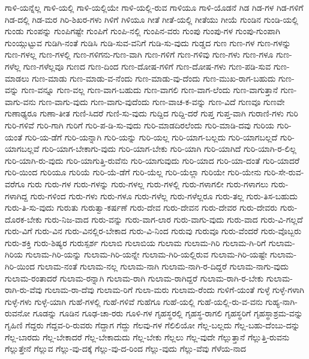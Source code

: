 {ಗಾಳಿ-ಯನ್ನೆಲ್ಲ
ಗಾಳಿ-ಯಲ್ಲಿ
ಗಾಳಿ-ಯಲ್ಲಿಯೇ
ಗಾಳಿ-ಯಲ್ಲಿ-ರುವ
ಗಾಳಿಯೂ
ಗಾಳಿ-ಯೊಡನೆ
ಗಿಡ
ಗಿಡ-ಗಳ
ಗಿಡ-ಗಳಿಗೆ
ಗಿಡ-ದಲ್ಲಿ
ಗಿಡ-ಮರ
ಗಿರಿ-ಶಿಖರ-ಗಳು
ಗಿಳಿಗೆ
ಗಿಳಿಯೂ
ಗೀತೆ
ಗೀತೆ-ಯಲ್ಲಿ
ಗೀತೆಯು
ಗೀಯೆ
ಗುಂಡಿನ
ಗುಂಡಿ-ಯಲ್ಲಿ
ಗುಂಡು
ಗುಂಪನ್ನು
ಗುಂಪಿಗಷ್ಟೇ
ಗುಂಪಿಗೆ
ಗುಂಪಿ-ನಲ್ಲಿ
ಗುಂಪಿನ-ವರು
ಗುಂಪು
ಗುಂಪು-ಗಳ
ಗುಂಪು-ಗುಂಪಾಗಿ
ಗುಂಯ್ಗುಟ್ಟುವ
ಗುಡಿಗಿ-ನಂತೆ
ಗುಡಿಸಿ
ಗುಡಿ-ಸುವ-ವನಿಗೆ
ಗುಡಿ-ಸು-ವುದು
ಗುಡ್ಡದ
ಗುಣ
ಗುಣ-ಗಳ
ಗುಣ-ಗಳನ್ನು
ಗುಣ-ಗಳಲ್ಲ
ಗುಣ-ಗಳಲ್ಲಿ
ಗುಣ-ಗಳಿಗನು-ಗುಣ-ವಾಗಿ
ಗುಣ-ಗಳಿಗೆ
ಗುಣ-ಗಳಿವು
ಗುಣ-ಗಳು
ಗುಣ-ಗಳೂ
ಗುಣ-ಗಳೆಲ್ಲ
ಗುಣ-ಗಳೆಲ್ಲವೂ
ಗುಣದ
ಗುಣ-ದಿಂದ
ಗುಣ-ದೋಷ-ಗಳಿಗೆ
ಗುಣ-ದೋಷ-ಗಳು
ಗುಣ-ಪಡಿ-ಸುವ
ಗುಣ-ಮಾಡಲು
ಗುಣ-ಮಾಡು
ಗುಣ-ಮಾಡು-ವ-ನೆಂದು
ಗುಣ-ಮಾಡು-ವು-ದೆಂದು
ಗುಣ-ಮುಖ-ರಾಗ-ಬಹುದು
ಗುಣ-ವನ್ನು
ಗುಣ-ವನ್ನೂ
ಗುಣ-ವಲ್ಲ
ಗುಣ-ವಾಗ-ಬಹುದು
ಗುಣ-ವಾಗಲಿ
ಗುಣ-ವಾಗ-ಲೆಂದು
ಗುಣ-ವಾಗುತ್ತಾನೆ
ಗುಣ-ವಾಗು-ವನು
ಗುಣ-ವಾಗು-ವುದು
ಗುಣ-ವಾಗು-ವುದೆಂದು
ಗುಣ-ವಾಚ-ಕ-ವನ್ನು
ಗುಣ-ವಿದೆ
ಗುಣವೂ
ಗುಣವೇ
ಗುಣಾಢ್ಯರೂ
ಗುಣಾ-ತೀತ
ಗುಣಿ-ಸಿದರೆ
ಗುಣಿ-ಸು-ವುದು
ಗುದ್ದಿದ
ಗುದ್ದಿ-ದರೆ
ಗುಪ್ತ
ಗುಪ್ತ-ವಾಗಿ
ಗುರಾಣಿ-ಗಳು
ಗುರಿ
ಗುರಿ-ಗಳಿವೆ
ಗುರಿ-ಗಾಗಿ
ಗುರಿಗೆ
ಗುರಿ-ಪ-ಡಿ-ಸು-ವುದು
ಗುರಿ-ಮಾಡದಿರಲೆಂದು
ಗುರಿ-ಮಾಡಿ-ದವು
ಗುರಿಯ
ಗುರಿ-ಯಂತೆ
ಗುರಿ-ಯ-ಡೆಗೆ
ಗುರಿ-ಯನ್ನಾಗಿ
ಗುರಿ-ಯನ್ನು
ಗುರಿ-ಯಲ್ಲ
ಗುರಿ-ಯಾಗ-ಬಲ್ಲದು
ಗುರಿ-ಯಾಗಬಲ್ಲದೆ
ಗುರಿ-ಯಾಗಬಲ್ಲವೆ
ಗುರಿ-ಯಾಗ-ಬೇಕಾಗು-ವುದು
ಗುರಿ-ಯಾಗ-ಬೇಕು
ಗುರಿ-ಯಾಗಿ
ಗುರಿ-ಯಾಗಿದೆ
ಗುರಿ-ಯಾಗಿ-ರ-ಲಿಲ್ಲ
ಗುರಿ-ಯಾಗಿ-ರು-ವುದು
ಗುರಿ-ಯಾಗುತ್ತಿ-ರುವೆನು
ಗುರಿ-ಯಾಗುವುದು
ಗುರಿ-ಯಾದ
ಗುರಿ-ಯಾ-ದಂತೆ
ಗುರಿ-ಯಾದರೆ
ಗುರಿ-ಯಿಂದ
ಗುರಿಯೂ
ಗುರಿಯೆ
ಗುರಿ-ಯೆ-ಡೆಗೆ
ಗುರಿ-ಯೆಲ್ಲ
ಗುರಿ-ಯೆಲ್ಲಾ
ಗುರಿಯೇ
ಗುರಿ-ಯೇನು
ಗುರಿ-ಸೇ-ರುವ-ವರೆಗೂ
ಗುರು
ಗುರು-ಗಳ
ಗುರು-ಗಳನ್ನು
ಗುರು-ಗಳಲ್ಲ
ಗುರು-ಗಳಲ್ಲಿ
ಗುರು-ಗಳಾಗಲೀ
ಗುರು-ಗಳಾಗಲು
ಗುರು-ಗಳಾಗಿದ್ದ
ಗುರು-ಗಳಿಂದ
ಗುರು-ಗಳು
ಗುರು-ಗಳೂ
ಗುರು-ಗಳೆಲ್ಲ
ಗುರು-ಗಳೆಲ್ಲರೂ
ಗುರು-ತಲ್ಲ
ಗುರು-ತಿಸ-ಬಹುದು
ಗುರು-ತಿ-ಸು-ವುದು
ಗುರುತು
ಗುರುತ್ವಾ-ಕರ್ಷಣೆ
ಗುರು-ದೇವ
ಗುರು-ದೇವನ
ಗುರು-ದೇವರ
ಗುರು-ದೇವರು
ಗುರು-ದೊರಕ-ಬೇಕು
ಗುರು-ನಿಜ-ವಾದ
ಗುರು-ವನ್ನು
ಗುರು-ವಾಗ-ಲಾರ
ಗುರು-ವಾಗು-ವುದು
ಗುರು-ವಾದ
ಗುರು-ವಿ-ಗಲ್ಲದೆ
ಗುರು-ವಿಗೆ
ಗುರು-ವಿನ
ಗುರು-ವಿನಲ್ಲಿರ-ಬೇಕಾದ
ಗುರು-ವಿ-ನಿಂದ
ಗುರುವು
ಗುರುವೂ
ಗುರು-ವೆಂದರೆ
ಗುರು-ವೊಬ್ಬರು
ಗುರು-ಶಕ್ತಿ
ಗುರು-ಶಿಷ್ಯರ
ಗುರುಸ್ಪರ್ಶ
ಗುಲಾಬಿ
ಗುಲಾಬಿಯ
ಗುಲಾಮ
ಗುಲಾಮ-ಗಿರಿ
ಗುಲಾಮ-ಗಿ-ರಿಗೆ
ಗುಲಾಮ-ಗಿರಿಯ
ಗುಲಾಮ-ಗಿರಿ-ಯನ್ನು
ಗುಲಾಮ-ಗಿರಿ-ಯನ್ನೇ
ಗುಲಾಮ-ಗಿರಿ-ಯಲ್ಲಿರುವ
ಗುಲಾಮ-ಗಿರಿ-ಯಷ್ಟೇ
ಗುಲಾಮ-ಗಿರಿ-ಯಿಂದ
ಗುಲಾಮ-ನಂತೆ
ಗುಲಾಮ-ನಲ್ಲ
ಗುಲಾಮ-ನಾಗಿ
ಗುಲಾಮ-ನಾಗಿ-ರ-ದಿದ್ದರೆ
ಗುಲಾಮ-ನಾಗು-ವುದು
ಗುಲಾಮ-ರಂತಾದರೆ
ಗುಲಾಮ-ರನ್ನಾಗಿ
ಗುಲಾಮ-ರಾಗಿ
ಗುಲಾಮ-ರಾಗಿದ್ದರೆ
ಗುಲಾಮ-ರಾಗಿ-ರ-ಬೇಕು
ಗುಲಾಮ-ರಾಗಿ-ರು-ವೆವು
ಗುಲಾಮ-ರಾ-ದೆವು
ಗುಲಾಮ-ರಿಗೆ
ಗುಲಾ-ಮರು
ಗುಲಾಮ-ರೆಂದು
ಗುಳಿಗೆ-ಯಂತೆ
ಗುಳ್ಳೆ
ಗುಳ್ಳೆ-ಗಳಾಗಿ
ಗುಳ್ಳೆ-ಗಳು
ಗುಳ್ಳೆ-ಯಾಗಿ
ಗುಹೆ-ಗಳಲ್ಲಿ
ಗುಹೆ-ಗಳಿವೆ
ಗುಹೆಗೂ
ಗುಹೆ-ಯಲ್ಲಿ
ಗುಹೆ-ಯಲ್ಲಿ-ರು-ವ-ವನು
ಗುಹ್ಯ-ನಾಗಿ-ರುವನೋ
ಗೂಡನ್ನು
ಗೂಡಿನ
ಗೂಢ-ಚಾ-ರರು
ಗೂಳಿ-ಗಳ
ಗೃಹಸ್ಥರಲ್ಲಿ
ಗೃಹಸ್ಥ-ರಾಗಲಿ
ಗೃಹಸ್ಥರಿಗೆ
ಗೃಹಸ್ಥಾಶ್ರಮ-ವನ್ನು
ಗೃಹಿಣಿ
ಗೆದ್ದರು
ಗೆದ್ದವ-ರಿ-ರುವರು
ಗೆದ್ದಾಗ
ಗೆದ್ದು
ಗೆಲವು-ಗಳ
ಗೆಲಿಲಿಯೋ
ಗೆಲ್ಲ-ಬಲ್ಲದು
ಗೆಲ್ಲ-ಬಹು-ದೆಂಬು-ದನ್ನು
ಗೆಲ್ಲ-ಬಾರದು
ಗೆಲ್ಲ-ಬೇಕಾದರೆ
ಗೆಲ್ಲ-ಬೇಕಾದುದು
ಗೆಲ್ಲ-ಬೇಕು
ಗೆಲ್ಲಲು
ಗೆಲ್ಲ-ವುದೇ
ಗೆಲ್ಲುತ್ತಾನೆ
ಗೆಲ್ಲುತ್ತಿ-ರುವನು
ಗೆಲ್ಲುತ್ತೇನೆ
ಗೆಲ್ಲುವ
ಗೆಲ್ಲು-ವು-ದಕ್ಕೆ
ಗೆಲ್ಲು-ವು-ದ-ರಿಂದ
ಗೆಲ್ಲು-ವುದು
ಗೆಲ್ಲು-ವೆವು
ಗೆಳೆಯ-ನಾದ
}
